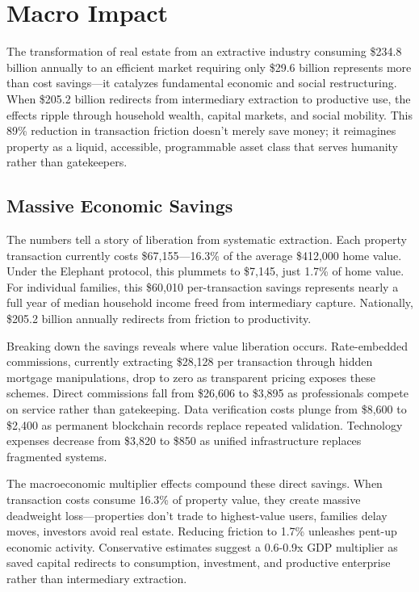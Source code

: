 \chapter{Macro Impact}

The transformation of real estate from an extractive industry consuming \$234.8 billion annually to an efficient market requiring only \$29.6 billion represents more than cost savings—it catalyzes fundamental economic and social restructuring. When \$205.2 billion redirects from intermediary extraction to productive use, the effects ripple through household wealth, capital markets, and social mobility. This 89\% reduction in transaction friction doesn't merely save money; it reimagines property as a liquid, accessible, programmable asset class that serves humanity rather than gatekeepers.

\section{Massive Economic Savings}

The numbers tell a story of liberation from systematic extraction. Each property transaction currently costs \$67,155—16.3\% of the average \$412,000 home value. Under the Elephant protocol, this plummets to \$7,145, just 1.7\% of home value. For individual families, this \$60,010 per-transaction savings represents nearly a full year of median household income freed from intermediary capture. Nationally, \$205.2 billion annually redirects from friction to productivity.

Breaking down the savings reveals where value liberation occurs. Rate-embedded commissions, currently extracting \$28,128 per transaction through hidden mortgage manipulations, drop to zero as transparent pricing exposes these schemes. Direct commissions fall from \$26,606 to \$3,895 as professionals compete on service rather than gatekeeping. Data verification costs plunge from \$8,600 to \$2,400 as permanent blockchain records replace repeated validation. Technology expenses decrease from \$3,820 to \$850 as unified infrastructure replaces fragmented systems.

The macroeconomic multiplier effects compound these direct savings. When transaction costs consume 16.3\% of property value, they create massive deadweight loss—properties don't trade to highest-value users, families delay moves, investors avoid real estate. Reducing friction to 1.7\% unleashes pent-up economic activity. Conservative estimates suggest a 0.6-0.9x GDP multiplier as saved capital redirects to consumption, investment, and productive enterprise rather than intermediary extraction.

